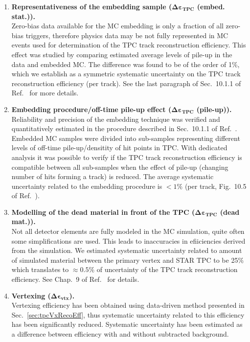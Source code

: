 \begin{enumerate}
 \item \textbf{Representativeness of the embedding sample ($\bm{\Delta\varepsilon_{\text{TPC}}}$ (embed. stat.)).}\\
 Zero-bias data available for the MC embedding is only a fraction of all zero-bias triggers, therefore physics data may be not fully represented in MC events used for determination of the TPC track reconstruction efficiency. This effect was studied by comparing estimated average levels of pile-up in the data and embedded MC. The difference was found to be of the order of 1\%, which we establish as a symmetric systematic uncertainty on the TPC track reconstruction efficiency (per track). See the last paragraph of Sec.~10.1.1 of Ref.~\cite{supplementaryNote} for more details.
 \item \textbf{Embedding procedure/off-time pile-up effect ($\bm{\Delta\varepsilon_{\text{TPC}}}$ (pile-up)).}\\
 Reliability and precision of the embedding technique was verified and quantitatively estimated in the procedure described in Sec.~10.1.1 of Ref.~\cite{supplementaryNote}. Embedded MC samples were divided into sub-samples representing different levels of off-time pile-up/densitity of hit points in TPC. With dedicated analysis it was possible to verify if the TPC track reconstruction efficiency is compatible between all sub-samples when the effect of pile-up (changing number of hits forming a track) is reduced. The average systematic uncertainty related to the embedding procedure is $<1\%$ (per track, Fig.~10.5 of Ref.~\cite{supplementaryNote}).
 \item \textbf{Modelling of the dead material in front of the TPC ($\bm{\Delta\varepsilon_{\text{TPC}}}$ (dead mat.)).}\\
 Not all detector elements are fully modeled in the MC simulation, quite often some simplifications are used. This leads to inaccuracies in efiiciencies derived from the simulation. We estimated systematic uncertainty related to amount of simulated material between the primary vertex and STAR TPC to be 25\% which translates to $\approx 0.5\%$ of uncertainty of the TPC track reconstruction efficiency. See Chap.~9 of Ref.~\cite{supplementaryNote} for details.
 \item \textbf{Vertexing ($\bm{\Delta\epsilon_{\text{vtx}}}$).}\\
 Vertexing efficiency has been obtained using data-driven method presented in Sec.~\ref{sec:tpcVxRecoEff}, thus systematic uncertainty related to this efficiency has been significantly reduced. Systematic uncertainty has been estimated as a difference between efficiency with and without subtracted background.

\end{enumerate}
